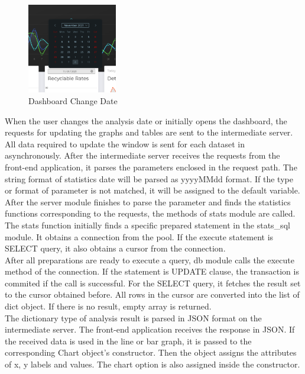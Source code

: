 \documentclass[conference]{IEEEtran}
\begin{document}
\begin{figure}[h]
    \centering
    \includegraphics[width=0.35\textwidth]{images/dashboard_change_date.eps}
    \caption{Dashboard Change Date}
\end{figure}

When the user changes the analysis date or initially opens the dashboard, the requests for updating the graphs and tables are sent to the intermediate server. All data required to update the window is sent for each dataset in asynchronously. After the intermediate server receives the requests from the front-end application, it parses the parameters enclosed in the request path. The string format of statistics date will be parsed as yyyyMMdd format. If the type or format of parameter is not matched, it will be assigned to the default variable.\\

After the server module finishes to parse the parameter and finds the statistics functions corresponding to the requests, the methods of stats module are called. The stats function initially finds a specific prepared statement in the stats\_sql module. It obtains a connection from the pool. If the execute statement is SELECT query, it also obtains a cursor from the connection.\\

After all preparations are ready to execute a query, db module calls the execute method of the connection. If the statement is UPDATE clause, the transaction is commited if the call is successful. For the SELECT query, it fetches the result set to the cursor obtained before. All rows in the cursor are converted into the list of dict object. If there is no result, empty array is returned.\\

The dictionary type of analysis result is parsed in JSON format on the intermediate server. The front-end application receives the response in JSON. If the received data is used in the line or bar graph, it is passed to the corresponding Chart object's constructor. Then the object assigns the attributes of x, y labels and values. The chart option is also assigned inside the constructor.\\
\end{document}
